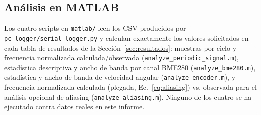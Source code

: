 \subsection{Análisis en MATLAB}

Los cuatro scripts en \texttt{matlab/} leen los CSV producidos por \texttt{pc\_logger/serial\_logger.py} y calculan exactamente los valores solicitados en cada tabla de resultados de la Sección~\ref{sec:resultados}: muestras por ciclo y frecuencia normalizada calculada/observada (\texttt{analyze\_periodic\_signal.m}), estadística descriptiva y ancho de banda por canal BME280 (\texttt{analyze\_bme280.m}), estadística y ancho de banda de velocidad angular (\texttt{analyze\_encoder.m}), y frecuencia normalizada calculada (plegada, Ec.~\ref{eq:aliasing}) vs. observada para el análisis opcional de aliasing (\texttt{analyze\_aliasing.m}). Ninguno de los cuatro se ha ejecutado contra datos reales en este informe.

